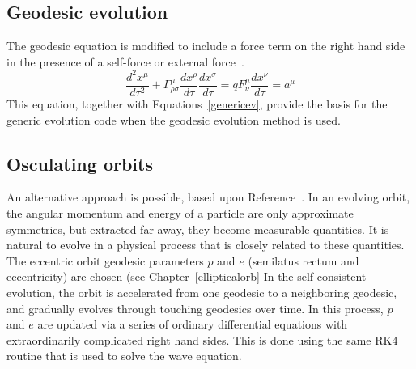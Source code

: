 \subsection{Geodesic evolution}
The geodesic equation is modified to include a force term on the right hand side in the presence of a self-force or external force~\cite{Carroll}.
\begin{equation}
  \frac{d^2x^\mu}{d\tau^2}+\Gamma^\mu_{\rho\sigma}\frac{dx^\rho}{d\tau}\frac{dx^\sigma}{d\tau}=qF^\mu_\nu\frac{dx^\nu}{d\tau}=a^\mu
\end{equation}
This equation, together with Equations~\ref{genericev}, provide the basis for the generic evolution code when the geodesic evolution method is used. 

\subsection{Osculating orbits}

An alternative approach is possible, based upon Reference~\cite{pound_poisson}. In an evolving orbit, the angular momentum and energy of a particle are only approximate symmetries, but extracted far away, they become measurable quantities. It is natural to evolve in a physical process that is closely related to these quantities. The eccentric orbit geodesic parameters $p$ and $e$ (semilatus rectum and eccentricity) are chosen (see Chapter~\ref{ellipticalorb} In the self-consistent evolution, the orbit is accelerated from one geodesic to a neighboring geodesic, and gradually evolves through touching geodesics over time. In this process, $p$ and $e$ are updated via a series of ordinary differential equations with extraordinarily complicated right hand sides. This is done using the same RK4 routine that is used to solve the wave equation.






